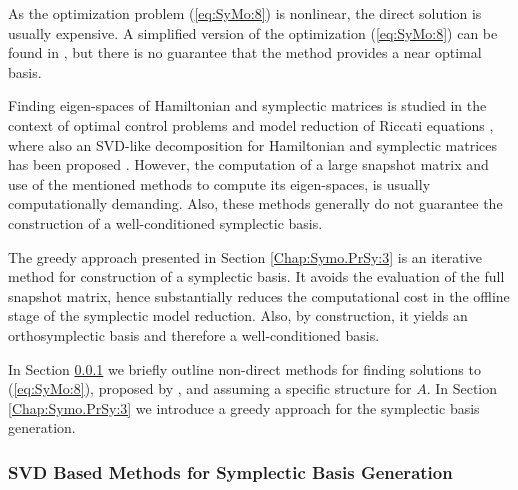 \documentclass[final]{siamart}
\begin{document}
As the optimization problem (\ref{eq:SyMo:8}) is nonlinear, the direct solution is usually expensive. A simplified version of the optimization (\ref{eq:SyMo:8}) can be found in \cite{Peng:2014di}, but there is no guarantee that the method provides a near optimal basis. 

{{\color{black}} Finding eigen-spaces of Hamiltonian and symplectic matrices is studied in the context of optimal control problems \cite{Benner:2000ww,Benner:1997ef,Watkins:2004kz,BunseGerstner:1986dg} and model reduction of Riccati equations \cite{Benner:1997ef}, where also an SVD-like decomposition for Hamiltonian and symplectic matrices has been proposed \cite{Xu:2003kx}. However, the computation of a large snapshot matrix and use of the mentioned methods to compute its eigen-spaces, is usually computationally demanding. Also, these methods generally do not guarantee the construction of a well-conditioned symplectic basis.
	
The greedy approach presented in Section \ref{Chap:Symo.PrSy:3} is an iterative method for construction of a symplectic basis. It avoids the evaluation of the full snapshot matrix, hence substantially reduces the computational cost in the offline stage of the symplectic model reduction. Also, by construction, it yields an orthosymplectic basis and therefore a well-conditioned basis.

In Section \ref{chap:SyMo.PrSy:2} we briefly outline non-direct methods for finding solutions to (\ref{eq:SyMo:8}), proposed by \cite{Peng:2014di}, and assuming a specific structure for $A$. In Section \ref{Chap:Symo.PrSy:3} we introduce a greedy approach for the symplectic basis generation.}

\subsubsection{SVD Based Methods for Symplectic Basis Generation} \label{chap:SyMo.PrSy:2} 
\end{document}
